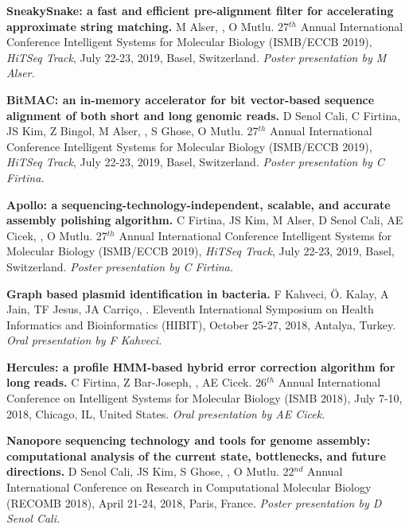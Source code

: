 \vspace{-.2cm}
  {\bf SneakySnake: a fast and efficient pre-alignment filter for accelerating approximate string matching.}
  M Alser, \calkan{}, O Mutlu.
27$^{th}$ Annual
International Conference Intelligent Systems for Molecular Biology (ISMB/ECCB 2019), {\em HiTSeq Track},
 July 22-23, 2019, Basel, Switzerland. {\it Poster presentation by M Alser.}

\vspace{-.2cm}
   {\bf BitMAC: an in-memory accelerator for bit vector-based sequence alignment of both
short and long genomic reads.}
  D Senol Cali, C Firtina, JS Kim, Z Bingol, M Alser, \calkan{},
S Ghose, O Mutlu.
27$^{th}$ Annual
International Conference Intelligent Systems for Molecular Biology (ISMB/ECCB 2019), {\em HiTSeq Track},
 July 22-23, 2019, Basel, Switzerland. {\it Poster presentation by C Firtina.}

\vspace{-.2cm}
   {\bf Apollo: a sequencing-technology-independent, scalable, and accurate assembly polishing algorithm.}
  C Firtina, JS Kim, M Alser, D Senol Cali, AE Cicek, \calkan{}, O Mutlu.
27$^{th}$ Annual
International Conference Intelligent Systems for Molecular Biology (ISMB/ECCB 2019), {\em HiTSeq Track},
 July 22-23, 2019, Basel, Switzerland. {\it Poster presentation by C Firtina.}


\vspace{-.2cm}
       {\bf Graph based plasmid identification in bacteria.}
       F Kahveci, Ö. Kalay, A Jain, TF Jesus, JA Carriço, \calkan{}.
       Eleventh International Symposium on Health Informatics and Bioinformatics (HIBIT), October 25-27, 2018, Antalya, Turkey.
       {\it Oral presentation by F Kahveci.}
       
\vspace{-.2cm}
        {\bf Hercules: a profile HMM-based hybrid error correction algorithm for long reads.} C Firtina, Z Bar-Joseph, \calkan{}, AE Cicek. 26$^{th}$ Annual International Conference on Intelligent Systems for Molecular Biology (ISMB 2018), July 7-10, 2018, Chicago, IL, United States.
       {\it Oral presentation by AE Cicek.}

\clearpage

\vspace{-.2cm}
       {\bf Nanopore sequencing technology and tools for genome assembly: computational analysis of the current state, bottlenecks, and future directions.}
       D Senol Cali, JS Kim, S Ghose, \calkan{}, O Mutlu.
       22$^{nd}$ Annual International Conference on Research in Computational Molecular Biology (RECOMB 2018), April 21-24, 2018, Paris, France.
       {\it Poster presentation by D Senol Cali.}

